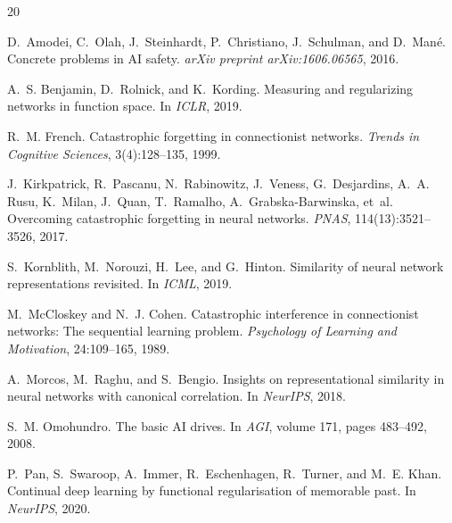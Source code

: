 \documentclass{article}
\begin{document}

\begin{thebibliography}{20}

D.~Amodei, C.~Olah, J.~Steinhardt, P.~Christiano, J.~Schulman, and D.~Man\'{e}.
\newblock Concrete problems in {AI} safety.
\newblock \emph{arXiv preprint arXiv:1606.06565}, 2016.

A.~S. Benjamin, D.~Rolnick, and K.~Kording.
\newblock Measuring and regularizing networks in function space.
\newblock In \emph{ICLR}, 2019.

R.~M. French.
\newblock Catastrophic forgetting in connectionist networks.
\newblock \emph{Trends in Cognitive Sciences}, 3(4):128--135, 1999.

J.~Kirkpatrick, R.~Pascanu, N.~Rabinowitz, J.~Veness, G.~Desjardins, A.~A. Rusu, K.~Milan, J.~Quan, T.~Ramalho, A.~Grabska-Barwinska, et~al.
\newblock Overcoming catastrophic forgetting in neural networks.
\newblock \emph{PNAS}, 114(13):3521--3526, 2017.

S.~Kornblith, M.~Norouzi, H.~Lee, and G.~Hinton.
\newblock Similarity of neural network representations revisited.
\newblock In \emph{ICML}, 2019.

M.~McCloskey and N.~J. Cohen.
\newblock Catastrophic interference in connectionist networks: The sequential learning problem.
\newblock \emph{Psychology of Learning and Motivation}, 24:109--165, 1989.

A.~Morcos, M.~Raghu, and S.~Bengio.
\newblock Insights on representational similarity in neural networks with canonical correlation.
\newblock In \emph{NeurIPS}, 2018.

S.~M. Omohundro.
\newblock The basic {AI} drives.
\newblock In \emph{AGI}, volume 171, pages 483--492, 2008.

P.~Pan, S.~Swaroop, A.~Immer, R.~Eschenhagen, R.~Turner, and M.~E. Khan.
\newblock Continual deep learning by functional regularisation of memorable past.
\newblock In \emph{NeurIPS}, 2020.


\end{thebibliography}
\end{document}
